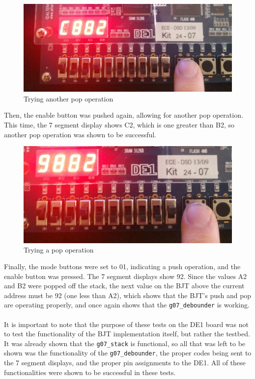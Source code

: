 \documentclass[12pt]{report}
\begin{document}
\begin{figure}[h]
	\begin{center}
		\caption{Trying another pop operation}
		\includegraphics[scale=0.15]{fpga5}
	\end{center}
\end{figure}
Then, the enable button was pushed again, allowing for another pop operation. This time, the 7
segment display shows C2, which is one greater than B2, so another pop operation was shown to be
successful.

\begin{figure}[h]
	\begin{center}
		\caption{Trying a pop operation}
		\includegraphics[scale=0.15]{fpga6}
	\end{center}
\end{figure}
Finally, the mode buttons were set to 01, indicating a push operation, and the enable button was
pressed. The 7 segment displays show 92. Since the values A2 and B2 were popped off the stack, the
next value on the BJT above the current address must be 92 (one less than A2), which shows that
the BJT's push and pop are operating properly, and once again shows that the \texttt{g07\_debounder}
is working. \\\\
It is important to note that the purpose of these tests on the DE1 board was not to test the
functionality of the BJT implementation itself, but rather the testbed. It was already shown that
the \texttt{g07\_stack} is functional, so all that was left to be shown was the functionality of the
\texttt{g07\_debounder}, the proper codes being sent to the 7 segment displays, and the proper pin
assignments to the DE1. All of these functionalities were shown to be successful in these tests.
\end{document}
